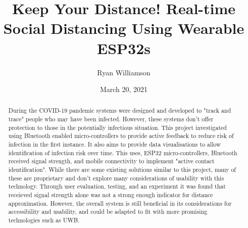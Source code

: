 \documentclass{l4proj}
\begin{document}
\title{Keep Your Distance! Real-time Social Distancing Using Wearable ESP32s}
\author{Ryan Williamson}
\date{March 20, 2021}

\maketitle

\begin{abstract}
    During the COVID-19 pandemic systems were designed and developed to "track and trace" people
    who may have been infected. However, these systems don't offer protection to those in the
    potentially infectious situation. This project investigated using Bluetooth enabled
    micro-controllers to provide active feedback to reduce risk of infection in the first instance.
    It also aims to provide data visualisations to allow identification of infection risk over
    time. This uses, ESP32 micro-controllers, Bluetooth received signal strength, and mobile
    connectivity to implement "active contact identification". While there are some existing
    solutions similar to this project, many of these are proprietary and don't explore many
    considerations of usability with this technology. Through user evaluation, testing, and an experiment
    it was found that receieved signal strength alone was not a strong enough indicator for
    distance approximation. However, the overall system is still beneficial in its considerations
    for accessibility and usability, and could be adapted to fit with more promising technologies such
    as UWB.
\end{abstract}


%
%
\def\consentname {Ryan Williamson} %
\def\consentdate {20 March 2021} %
%
\educationalconsent
\end{document}
